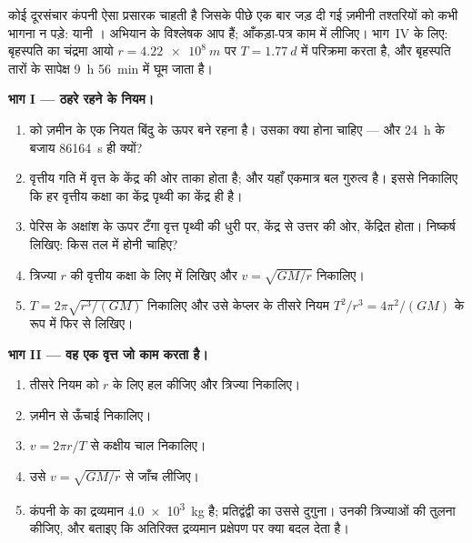 \begin{problem}
\label{pb:g12:satellites-kepler:1}
कोई दूरसंचार कंपनी ऐसा प्रसारक चाहती है जिसके पीछे एक बार जड़ दी गई ज़मीनी
तश्तरियों को कभी भागना न पड़े: यानी  । अभियान के
विश्लेषक आप हैं; आँकड़ा-पत्र काम में लीजिए। भाग~IV के लिए: बृहस्पति का चंद्रमा
आयो $r = \qty{4.22e8}{m}$ पर $T = \qty{1.77}{d}$ में परिक्रमा करता है, और बृहस्पति तारों के
सापेक्ष \qty{9}{h} \qty{56}{min} में घूम जाता है।

\medskip
\noindent\textbf{भाग I --- ठहरे रहने के नियम।}
\begin{enumerate}
  \item {} को ज़मीन के एक नियत बिंदु के ऊपर बने रहना है। उसका
         क्या होना चाहिए --- और \qty{24}{h} के बजाय
         \qty{86164}{s} ही क्यों?
  \item वृत्तीय गति में  वृत्त के केंद्र की ओर ताका होता
        है; और यहाँ एकमात्र बल गुरुत्व है। इससे निकालिए कि हर
        वृत्तीय कक्षा का केंद्र पृथ्वी का केंद्र ही है।
  \item पेरिस के अक्षांश के ऊपर टँगा वृत्त पृथ्वी की धुरी पर, केंद्र से उत्तर
        की ओर, केंद्रित होता। निष्कर्ष लिखिए:  किस तल
        में होनी चाहिए?
  \item त्रिज्या $r$ की वृत्तीय कक्षा के लिए 
        में  लिखिए और $v = \sqrt{GM/r}$ निकालिए।
  \item $T = 2\pi\sqrt{r^3/(GM)}$ निकालिए और उसे केप्लर के तीसरे नियम $T^2/r^3 = 4\pi^2/(GM)$ के रूप में फिर से
        लिखिए।
\end{enumerate}

\medskip
\noindent\textbf{भाग II --- वह एक वृत्त जो काम करता है।}
\begin{enumerate}[resume]
  \item तीसरे नियम को $r$ के लिए हल कीजिए और  त्रिज्या
        निकालिए।
  \item ज़मीन से ऊँचाई निकालिए।
  \item $v = 2\pi r/T$ से कक्षीय चाल निकालिए।
  \item उसे $v = \sqrt{GM/r}$ से जाँच लीजिए।
  \item कंपनी के  का द्रव्यमान \qty{4.0e3}{kg} है; प्रतिद्वंद्वी का
        उससे दुगुना। उनकी  त्रिज्याओं की तुलना कीजिए, और
        बताइए कि अतिरिक्त द्रव्यमान प्रक्षेपण पर क्या बदल देता है।
\end{enumerate}


\end{problem}
